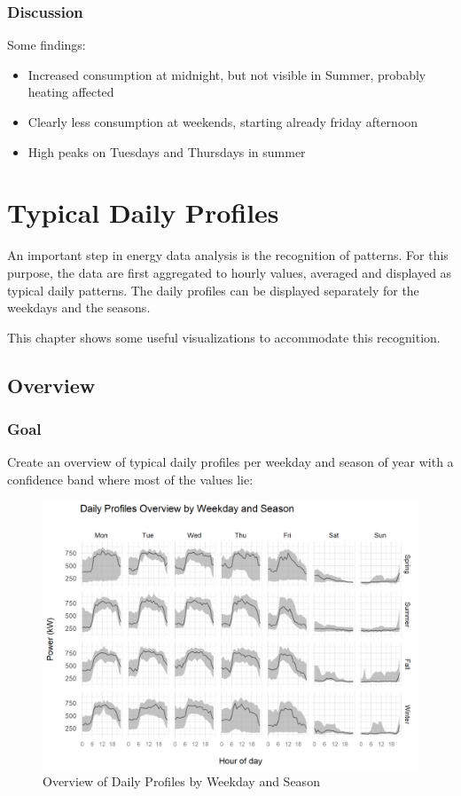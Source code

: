 \documentclass[
  a4paperpaper,
]{book}
\begin{document}
\hypertarget{discussion-6}{%
\subsection{Discussion}\label{discussion-6}}

Some findings:

\begin{itemize}
\item
  Increased consumption at midnight, but not visible in Summer, probably heating affected
\item
  Clearly less consumption at weekends, starting already friday afternoon
\item
  High peaks on Tuesdays and Thursdays in summer
\end{itemize}

\hypertarget{typical-daily-profiles}{%
\chapter{Typical Daily Profiles}\label{typical-daily-profiles}}

An important step in energy data analysis is the recognition of patterns. For this purpose, the data are first aggregated to hourly values, averaged and displayed as typical daily patterns. The daily profiles can be displayed separately for the weekdays and the seasons.

This chapter shows some useful visualizations to accommodate this recognition.

\newpage

\hypertarget{overview}{%
\section{Overview}\label{overview}}

\hypertarget{goal-12}{%
\subsection{Goal}\label{goal-12}}

Create an overview of typical daily profiles per weekday and season of year with a confidence band where most of the values lie:

\begin{figure}
\includegraphics[width=0.7\linewidth]{images/plotDailyProfOverview} \caption{Overview of Daily Profiles by Weekday and Season}\label{fig:unnamed-chunk-21}
\end{figure}
\end{document}
